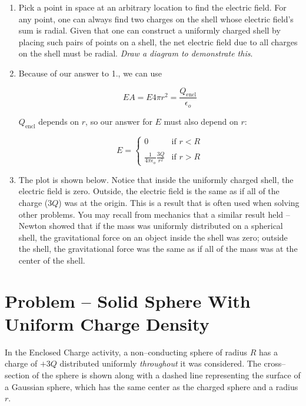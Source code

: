 \documentclass{article}
\newcommand{\ds}[0]{\displaystyle}
\begin{document}
\begin{enumerate}

  \item Pick a point in space at an arbitrary location to find the electric field. For any point, one can always find two charges on the shell whose electric field's sum is radial. Given that one can construct a uniformly charged shell by placing such pairs of points on a shell, the net electric field due to all charges on the shell must be radial. \emph{Draw a diagram to demonstrate this}.

  \item Because of our answer to 1., we can use

        $$EA = E 4\pi r^2 = \frac{Q_{\text{encl}}}{\epsilon_o}$$

        $Q_{\text{encl}}$ depends on $r$, so our answer for $E$ must also depend on $r$:

        $$
        E = \begin{cases}
          0   &\text{if } r < R \\\\
          \ds\frac{1}{4\pi\epsilon_o}\frac{3Q}{r^2} &\text{if } r > R
        \end{cases}
        $$

  \item The plot is shown below. Notice that inside the uniformly charged shell, the electric field is zero. Outside, the electric field is the same as if all of the charge ($3Q$) was at the origin. This is a result that is often used when solving other problems. You may recall from mechanics that a similar result held -- Newton showed that if the mass was uniformly distributed on a spherical shell, the gravitational force on an object inside the shell was zero; outside the shell, the gravitational force was the same as if all of the mass was at the center of the shell.

        

\end{enumerate}

\newpage

\section{Problem -- Solid Sphere With Uniform Charge Density}

In the Enclosed Charge activity, a non--conducting sphere of radius $R$ has a charge of $+3Q$ distributed uniformly \emph{throughout} it was considered. The cross--section of the sphere is shown along with a dashed line representing the surface of a Gaussian sphere, which has the same center as the charged sphere and a radius $r$.
\end{document}

